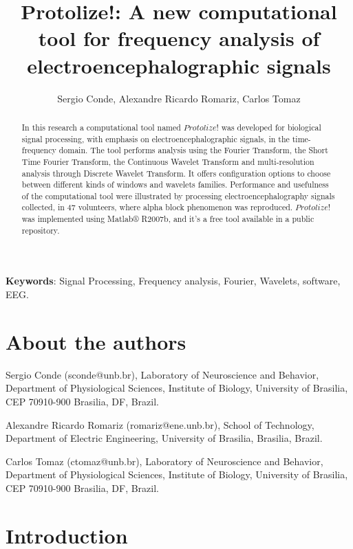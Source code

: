 \documentclass[12pt, a4paper]{article}
\begin{document}
\title{Protolize!: A new computational tool for frequency analysis of electroencephalographic signals}
\author{Sergio Conde, Alexandre Ricardo Romariz, Carlos Tomaz}
\date{}
\maketitle

\begin{abstract}

In this research a computational tool named $Protolize!$ was developed for biological signal processing, with emphasis on electroencephalographic signals, in the time-frequency domain. The tool performs analysis using the Fourier Transform, the Short Time Fourier Transform, the Continuous Wavelet Transform and multi-resolution analysis through Discrete Wavelet Transform. It offers configuration options to choose between different kinds of windows and wavelets families. Performance and usefulness of the computational tool were illustrated by processing electroencephalography signals collected, in 47 volunteers, where alpha block phenomenon was reproduced. $Protolize!$ was implemented using Matlab® R2007b, and it’s a free tool available in a public repository. 

\end{abstract}

\textbf{Keywords}: Signal Processing, Frequency analysis, Fourier, Wavelets, software, EEG.

\section{About the authors}

Sergio Conde (sconde@unb.br), Laboratory of Neuroscience and Behavior, Department of Physiological Sciences, Institute of Biology, University of Brasilia, CEP 70910-900 Brasilia, DF,  Brazil.

Alexandre Ricardo Romariz (romariz@ene.unb.br), School of Technology, Department of Electric Engineering, University of Brasilia, Brasilia, Brazil.

Carlos Tomaz (ctomaz@unb.br), Laboratory of Neuroscience and Behavior, Department of Physiological Sciences, Institute of Biology, University of Brasilia, CEP 70910-900 Brasilia, DF,  Brazil.

\section{Introduction}
\end{document}
